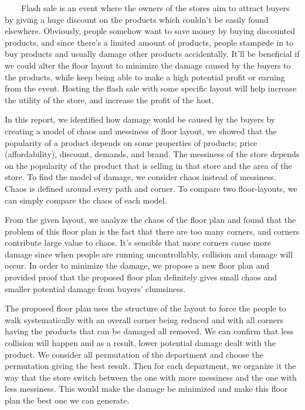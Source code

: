 \ \ \ \ Flash sale is an event where the owners of the stores aim to attract buyers by giving a huge discount on the products which couldn’t be easily found elsewhere. Obviously, people somehow want to save money by buying discounted products, and since there’s a limited amount of products, people stampede in to buy products and usually damage other products accidentally. It’ll be beneficial if we could alter the floor layout to minimize the damage caused by the buyers to the products, while keep being able to make a high potential profit or earning from the event. Hosting the flash sale with some specific layout will help increase the utility of the store, and increase the profit of the host. \newline\par
In this report, we identified how damage would be caused by the buyers by creating a model of chaos and messiness of floor layout, we showed that the popularity of a product depends on some properties of products; price (affordability), discount, demands, and brand. The messiness of the store depends on the popularity of the product that is selling in that store and the area of the store. To find the model of damage, we consider chaos instead of messiness. Chaos is defined around every path and corner. To compare two floor-layouts, we can simply compare the chaos of each model. \newline\par 
From the given layout, we analyze the chaos of the floor plan and found that the problem of this floor plan is the fact that there are too many corners, and corners contribute large value to chaos. It’s sensible that more corners cause more damage since when people are running uncontrollably, collision and damage will occur. In order to minimize the damage, we propose a new floor plan and provided proof that the proposed floor plan definitely gives small chaos and smaller potential damage from buyers’ clumsiness. \newline\par
The proposed floor plan uses the structure of the layout to force the people to walk systematically with an overall corner being reduced and with all corners having the products that can be damaged all removed. We can confirm that less collision will happen and as a result, lower potential damage dealt with the product. We consider all permutation of the department and choose the permutation giving the best result. Then for each department, we organize it the way that the store switch between the one with more messiness and the one with less messiness. This would make the damage be minimized and make this floor plan the best one we can generate. \newline